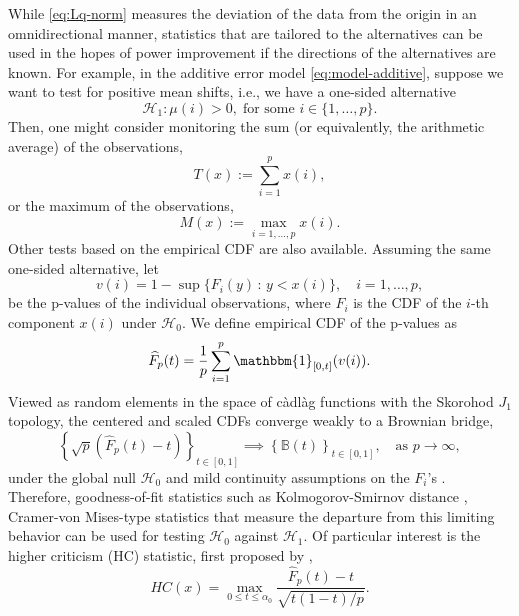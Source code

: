 While \eqref{eq:Lq-norm} measures the deviation of the data from the origin in an omnidirectional manner, statistics that are tailored to the alternatives can be used in the hopes of power improvement if the directions of the alternatives are known.
For example, in the additive error model \eqref{eq:model-additive}, suppose we want to test for positive mean shifts, i.e., 
we have a one-sided alternative
\begin{equation} \label{eq:global-test-one-sided}
    \mathcal{H}_1: \mu(i)> 0, \; \text{for some }i\in\{1,\ldots,p\}.
\end{equation}
Then, one might consider monitoring the sum (or equivalently, the arithmetic average) of the observations, 
\begin{equation} \label{eq:sum-statistic}
    T(x) := \sum_{i=1}^p{x(i)},
\end{equation}
or the maximum of the observations,
\begin{equation} \label{eq:max-statistic}
    M(x) := \max_{i=1,\ldots,p}{x(i)}.
\end{equation}
Other tests based on the empirical \ac{CDF} are also available.
Assuming the same one-sided alternative, let 
\begin{equation}
    v(i) = 1 - \sup\{F_i(y)\,:\,y<x(i)\}, \quad i = 1,\ldots,p,
\end{equation}
be the p-values of the individual observations, where $F_i$ is the \ac{CDF} of the $i$-th component $x(i)$ under $\mathcal{H}_0$.
We define empirical \ac{CDF} of the p-values as
\begin{equation}
    \widehat{F}_p(t) = 
    \frac{1}{p} \sum_{i=1}^p \mathbbm{1}_{[0, t]}(v(i)).
\end{equation}
Viewed as random elements in the space of c\`adl\`ag functions with the Skorohod $J_1$ topology, the centered and scaled \ac{CDF}s converge weakly to a Brownian bridge,
\begin{equation*}
    \left\{\sqrt{p}\left(\widehat{F}_p(t) - t\right)\right\}_{t\in[0,1]} 
    \implies
    \left\{\mathbb{B}(t)\right\}_{t\in[0,1]},\ \ \ \mbox{ as } p\to\infty,
\end{equation*}
under the global null $\mathcal{H}_0$ and mild continuity assumptions on the $F_i$'s \citep{skorokhod1956limit}. 
Therefore, goodness-of-fit statistics such as Kolmogorov-Smirnov distance \citep{smirnov1948table}, Cramer-von Mises-type statistics \citep{cramer1928composition, anderson1952asymptotic} that measure the departure from this limiting behavior can be used for testing $\mathcal{H}_0$ against $\mathcal{H}_1$.
Of particular interest is the higher criticism (\ac{HC}) statistic, first proposed by \cite{tukey1976lecture},
\begin{equation} \label{eq:HC-statistic}
    HC(x) = 
    \max_{0\le t\le\alpha_0}\frac{\widehat{F}_p(t) - t}{\sqrt{t(1 - t)/p}}.
\end{equation}

